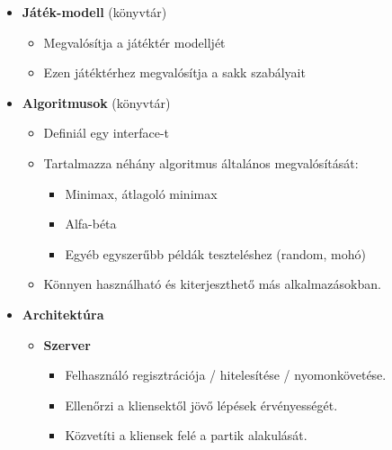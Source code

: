 \documentclass[twoside, a4paper, 12pt]{book}
\begin{document}
\begin{itemize}
	
	\item \textbf{Játék-modell} (könyvtár)
	\begin{itemize}
		\item Megvalósítja a játéktér modelljét
		\item Ezen játéktérhez megvalósítja a sakk szabályait
	\end{itemize}
	
	\item \textbf{Algoritmusok} (könyvtár)
	\begin{itemize}
		\item Definiál egy interface-t
		\item Tartalmazza néhány algoritmus általános megvalósítását:
		\begin{itemize}
			\item Minimax, átlagoló minimax
			\item Alfa-béta
			\item Egyéb egyszerűbb példák teszteléshez (random, mohó)
		\end{itemize}
		\item Könnyen használható és kiterjeszthető más alkalmazásokban.
	\end{itemize}
	
	\item \textbf{Architektúra}
	\begin{itemize}
		\item \textbf{Szerver}
		\begin{itemize}
			\item Felhasználó regisztrációja / hitelesítése / nyomonkövetése.
			\item Ellenőrzi a kliensektől jövő lépések érvényességét.
			\item Közvetíti a kliensek felé a partik alakulását.
		\end{itemize}
		

\end{itemize}
\end{itemize}
\end{document}
